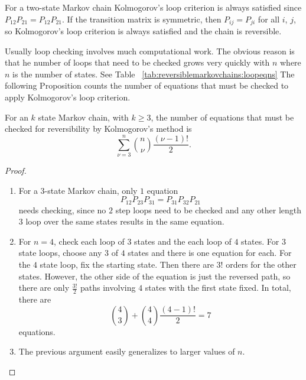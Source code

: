 \documentclass[12pt]{article}
\begin{document}
For a two-state Markov chain Kolmogorov's loop criterion is always
satisfied since \( P_{12} P_{21} = P_{12} P_{21} \).  If the transition
matrix is symmetric, then \( P_{ij} = P_{ji} \) for all \( i \), \( j \),
so Kolmogorov's loop criterion is always satisfied and the chain is
reversible.

Usually loop checking involves much computational work.  The obvious
reason is that he number of loops that need to be checked grows very
quickly with \( n \) where \( n \) is the number of states.  See Table~%
\ref{tab:reversiblemarkovchains:loopeqns} The following Proposition
counts the number of equations that must be checked to apply
Kolmogorov's loop criterion.

\begin{proposition}
    For an \( k \) state Markov chain, with \( k \ge 3 \), the number of
    equations that must be checked for reversibility by Kolmogorov's
    method is
    \[
        \sum_{\nu=3}^n \binom{n}{\nu} \frac{(\nu-1)!}{2}.
    \]
\end{proposition}

\begin{proof}
    \begin{enumerate}
        \item
            For a \( 3 \)-state Markov chain, only \( 1 \) equation
            \[
                P_{12}P_{23}P_{31} = P_{31} P_{32} P_{21}
            \] needs checking, since no \( 2 \) step loops need to be
            checked and any other length \( 3 \) loop over the same
            states results in the same equation.
        \item
            For \( n=4 \), check each loop of \( 3 \) states and the
            each loop of \( 4 \) states. For \( 3 \) state loops, choose
            any \( 3 \) of \( 4 \) states and there is one equation for
            each.  For the \( 4 \) state loop, fix the starting state.
            Then there are \( 3! \) orders for the other states.
            However, the other side of the equation is just the reversed
            path, so there are only \( \frac{3!}{2} \) paths involving \(
            4 \) states with the first state fixed.  In total, there are
            \[
                \binom{4}{3} + \binom{4}{4} \frac{(4-1)!}{2} = 7
            \] equations.
        \item
            The previous argument easily generalizes to larger values of
            \( n \).
    \end{enumerate}
\end{proof}
\end{document}
